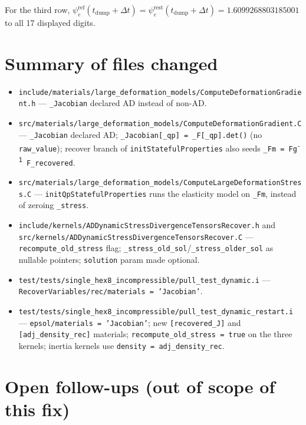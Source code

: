 \documentclass[11pt]{article}
\begin{document}
For the third row, $\psi_e^{\text{ref}}(t_{\text{dump}}+\Delta t) = \psi_e^{\text{rest}}(t_{\text{dump}}+\Delta t) = 1.6099268803185001$ to all 17 displayed digits.

\section{Summary of files changed}

\begin{itemize}
\item \texttt{include/materials/large\_deformation\_models/ComputeDeformationGradient.h} --- \texttt{\_Jacobian} declared AD instead of non-AD.
\item \texttt{src/materials/large\_deformation\_models/ComputeDeformationGradient.C} --- \texttt{\_Jacobian} declared AD; \texttt{\_Jacobian[\_qp] = \_F[\_qp].det()} (no \texttt{raw\_value}); recover branch of \texttt{initStatefulProperties} also seeds \texttt{\_Fm = Fg\textsuperscript{-1}\,F\_recovered}.
\item \texttt{src/materials/large\_deformation\_models/ComputeLargeDeformationStress.C} --- \texttt{initQpStatefulProperties} runs the elasticity model on \texttt{\_Fm}, instead of zeroing \texttt{\_stress}.
\item \texttt{include/kernels/ADDynamicStressDivergenceTensorsRecover.h} and \texttt{src/kernels/ADDynamicStressDivergenceTensorsRecover.C} --- \texttt{recompute\_old\_stress} flag; \texttt{\_stress\_old\_sol}/\texttt{\_stress\_older\_sol} as nullable pointers; \texttt{solution} param made optional.
\item \texttt{test/tests/single\_hex8\_incompressible/pull\_test\_dynamic.i} --- \texttt{RecoverVariables/rec/materials = 'Jacobian'}.
\item \texttt{test/tests/single\_hex8\_incompressible/pull\_test\_dynamic\_restart.i} --- \texttt{epsol/materials = 'Jacobian'}; new \texttt{[recovered\_J]} and \texttt{[adj\_density\_rec]} materials; \texttt{recompute\_old\_stress = true} on the three kernels; inertia kernels use \texttt{density = adj\_density\_rec}.
\end{itemize}

\section{Open follow-ups (out of scope of this fix)}
\end{document}
